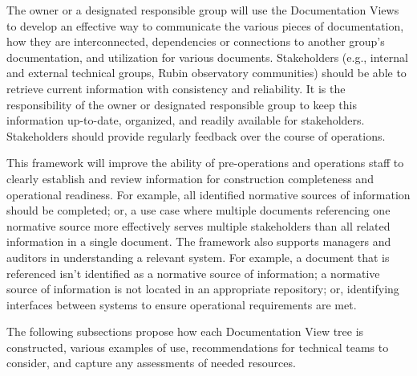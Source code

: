 The owner or a designated responsible group will use the Documentation Views to develop an effective way to communicate the various pieces of documentation, how they are interconnected, dependencies or connections to another group's documentation, and utilization for various documents.
Stakeholders (e.g., internal and external technical groups, Rubin observatory communities) should be able to retrieve current information with consistency and reliability.
It is the responsibility of the owner or designated responsible group to keep this information up-to-date, organized, and readily available for stakeholders.
Stakeholders should provide regularly feedback over the course of operations.

This framework will improve the ability of pre-operations and operations staff to clearly establish and review information for construction completeness and operational readiness.
For example, all identified normative sources of information should be completed; or, a use case where multiple documents referencing one normative source more effectively serves multiple stakeholders than all related information in a single document.
The framework also supports managers and auditors in understanding a relevant system.
For example, a document that is referenced isn't identified as a normative source of information; a normative source of information is not located in an appropriate repository; or, identifying interfaces between systems to ensure operational requirements are met.

The following subsections propose how each Documentation View tree is constructed, various examples of use, recommendations for technical teams to consider, and capture any assessments of needed resources.






